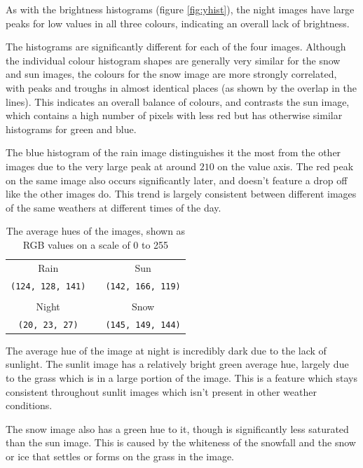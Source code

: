 \documentclass[a4paper,12pt,twoside]{report}
\begin{document}
As with the brightness histograms (figure \ref{fig:yhist}), the night images have large peaks for low values in all three colours, indicating an overall lack of brightness. 

The histograms are significantly different for each of the four images. Although the individual colour histogram shapes are generally very similar for the snow and sun images, the colours for the snow image are more strongly correlated, with peaks and troughs in almost identical places (as shown by the overlap in the lines). This indicates an overall balance of colours, and contrasts the sun image, which contains a high number of pixels with less red but has otherwise similar histograms for green and blue.

The blue histogram of the rain image distinguishes it the most from the other images due to the very large peak at around $210$ on the value axis. The red peak on the same image also occurs significantly later, and doesn't feature a drop off like the other images do. This trend is largely consistent between different images of the same weathers at different times of the day.

\begin{table}[H]
  \centering
  \begin{tabular}{ccc}
  \toprule
   Rain & & Sun \\
   \cellcolor[HTML]{7c808d}\texttt{(124, 128, 141)} & & \cellcolor[HTML]{8ea677}\texttt{(142, 166, 119)} \\
   \\
   Night & & Snow \\
   \cellcolor[HTML]{14171b}\color{white}\texttt{(20, 23, 27)} & & \cellcolor[HTML]{919590}\texttt{(145, 149, 144)} \\
  \bottomrule
  \end{tabular}
  \caption{The average hues of the images, shown as RGB values on a scale of 0 to 255}
\end{table}

The average hue of the image at night is incredibly dark due to the lack of sunlight. The sunlit image has a relatively bright green average hue, largely due to the grass which is in a large portion of the image. This is a feature which stays consistent throughout sunlit images which isn't present in other weather conditions.

The snow image also has a green hue to it, though is significantly less saturated than the sun image. This is caused by the whiteness of the snowfall and the snow or ice that settles or forms on the grass in the image.
\end{document}
